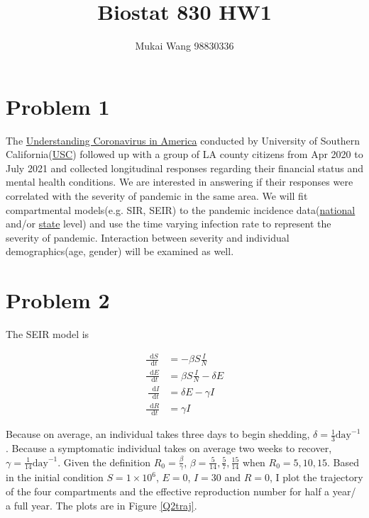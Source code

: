 \documentclass[12pt]{article}
\title{Biostat 830 HW1}
\date{}
\author{Mukai Wang 98830336}
\newcommand*\diff{\mathop{}\!\mathrm{d}}
\begin{document}
\maketitle

\section*{Problem 1}

 The \href{https://uasdata.usc.edu/index.php}{Understanding Coronavirus in America} conducted by University of Southern California(\href{https://uasdata.usc.edu/index.php}{USC}) followed up with a group of LA county citizens from Apr 2020 to July 2021 and collected longitudinal responses regarding their financial status and mental health conditions. We are interested in answering if their responses were correlated with the severity of pandemic in the same area. We will fit compartmental models(e.g. SIR, SEIR) to the pandemic incidence data(\href{https://data.cdc.gov/browse?q=COVID-19&sortBy=relevance}{national} and/or \href{https://data.ca.gov/group/covid-19}{state} level) and use the time varying infection rate to represent the severity of pandemic. Interaction between severity and individual demographics(age, gender) will be examined as well.

\section*{Problem 2}

The SEIR model is

\begin{align*}
	\frac{\diff S}{\diff t} &= -\beta S \frac{I}{N}\\
	\frac{\diff E}{\diff t} &= \beta S \frac{I}{N} - \delta E\\\
	\frac{\diff I}{\diff t} &= \delta E - \gamma I\\
	\frac{\diff R}{\diff t} &= \gamma I
\end{align*}

Because on average, an individual takes three days to begin shedding, $\delta = \frac{1}{3} \text{day}^{-1}$. Because a symptomatic individual takes on average two weeks to recover, $\gamma = \frac{1}{14} \text{day}^{-1}$. Given the definition $R_{0} = \frac{\beta}{\gamma}$, $\beta = \frac{5}{14}, \frac{5}{7}, \frac{15}{14}$ when $R_{0} = 5, 10, 15$.
Based in the initial condition $S=1\times 10^6$, $E=0$, $I=30$ and $R=0$, I plot the trajectory of the four compartments and the effective reproduction number for half a year/ a full year. The plots are in Figure \ref{Q2traj}.
\end{document}

